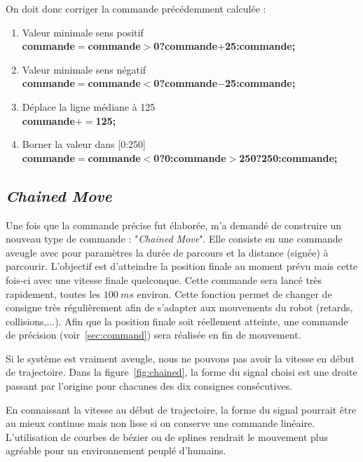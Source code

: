 On doit donc corriger la commande %
pr\'ec\'edemment calcul\'ee :

\begin{enumerate}
\item Valeur minimale sens positif\\
{\bf commande$=$commande$>$0?commande$+$25:commande;}
\item Valeur minimale sens n\'egatif\\
{\bf commande$=$commande$<$0?commande$-$25:commande;}
\item D\'eplace la ligne m\'ediane \`a 125\\
{\bf commande$+=$125;}
\item Borner la valeur dans [0:250]\\
{\bf commande$=$commande$<$0?0:commande$>$250?250:commande;}
\end{enumerate}


\subsection{\emph{Chained Move}}
\label{sub:chained}

Une fois que la commande pr\'ecise fut \'elabor\'ee, \rory m'a demand\'e de construire un nouveau type de commande : "\emph{Chained Move}".
Elle consiste en une commande aveugle avec pour param\`etres la dur\'ee de parcours et la distance (sign\'ee) \`a parcourir.
L'objectif est d'atteindre la position finale au moment pr\'evu mais cette fois-ci avec une vitesse finale quelconque. 
Cette commande sera lanc\'e tr\`es rapidement, toutes les $100~ms$ environ.
Cette fonction permet de changer de consigne tr\`es r\'eguli\`erement afin de s'adapter aux mouvements du robot (retards, collisions,...).
Afin que la position finale soit r\'eellement atteinte, une commande de pr\'ecision (voir~\ref{sec:command}) sera r\'ealis\'ee en fin de mouvement.

Si le syst\`eme est vraiment aveugle, nous ne pouvons pas avoir la vitesse en d\'ebut de trajectoire.
Dans la figure~\ref{fig:chained}, la forme du signal choisi est une droite passant par l'origine pour chacunes des dix consignes cons\'ecutives.

En connaissant la vitesse au d\'ebut de trajectoire, la forme du signal pourrait \^etre au mieux continue mais non lisse si on conserve une commande lin\'eaire.
L'utilisation de courbes de b\'ezier ou de splines rendrait le mouvement plus agr\'eable pour un environnement peupl\'e d'humains.

\newpage
